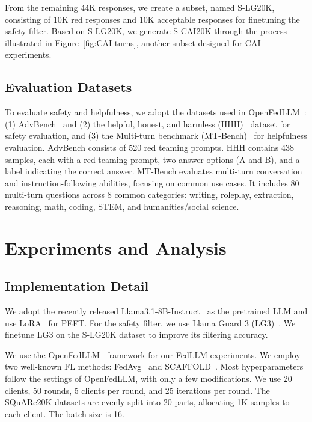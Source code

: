 From the remaining 44K responses, we create a subset, named S-LG20K, consisting of 10K red responses and 10K acceptable responses for finetuning the safety filter. 
Based on S-LG20K, we generate S-CAI20K through the process illustrated in Figure~\ref{fig:CAI-turns}, another subset designed for CAI experiments.


\subsection{Evaluation Datasets}
To evaluate safety and helpfulness, we adopt the datasets used in OpenFedLLM~\cite{OpenFedLLM}:  
(1) AdvBench~\cite{advbench} and (2) the helpful, honest, and harmless (HHH)~\cite{hhh} dataset for safety evaluation, and (3) the Multi-turn benchmark (MT-Bench)~\cite{mtbench} for helpfulness evaluation.  
AdvBench consists of 520 red teaming prompts.  
HHH contains 438 samples, each with a red teaming prompt, two answer options (A and B), and a label indicating the correct answer.  
MT-Bench evaluates multi-turn conversation and instruction-following abilities, focusing on common use cases.  
It includes 80 multi-turn questions across 8 common categories: writing, roleplay, extraction, reasoning, math, coding, STEM, and humanities/social science.


\section{Experiments and Analysis}
\subsection{Implementation Detail}\label{subsec:imple}
We adopt the recently released Llama3.1-8B-Instruct~\cite{llama3.1} as the pretrained LLM and use LoRA~\cite{lora} for PEFT.
For the safety filter, we use Llama Guard 3 (LG3)~\cite{llamaguard}. 
We finetune LG3 on the S-LG20K dataset to improve its filtering accuracy.


We use the OpenFedLLM~\cite{OpenFedLLM} framework for our FedLLM experiments.
We employ two well-known FL methods: FedAvg~\cite{fedavg} and SCAFFOLD~\cite{scaffold}.
Most hyperparameters follow the settings of OpenFedLLM, with only a few modifications.  
We use 20 clients, 50 rounds, 5 clients per round, and 25 iterations per round.  
The SQuARe20K datasets are evenly split into 20 parts, allocating 1K samples to each client.  
The batch size is 16.


